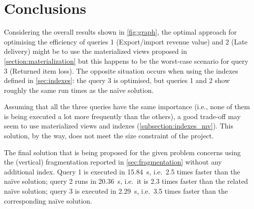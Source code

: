 

\section{Conclusions}
\label{section:conclusions}

Considering the overall results shown in \autoref{fig:graph}, the optimal approach for optimising the efficiency of queries 1 (Export/import revenue value) and 2 (Late delivery) might be to use the materialized views proposed in \autoref{section:materialization} but this happens to be the worst-case scenario for query 3 (Returned item loss).
The opposite situation occurs when using the indexes defined in \autoref{sec:indexes}: the query 3 is optimised, but queries 1 and 2 show roughly the same run times as the na\"{i}ve solution.

Assuming that all the three queries have the same importance (i.e., none of them is being executed a lot more frequently than the others), a good trade-off may seem to use materialized views and indexes (\autoref{subsection:indexes_mv}). This solution, by the way, does not meet the size constraint of the project.

The final solution that is being proposed for the given problem concerns using the (vertical) fragmentation reported in \autoref{sec:fragmentation} without any additional index. Query 1 is executed in \SI{15.84}{\s}, i.e.\ 2.5 times faster than the na\"{i}ve solution; query 2 runs in \SI{20.36}{\s}, i.e.\ it is 2.3 times faster than the related na\"{i}ve solution; query 3 is executed in \SI{2.29}{\s}, i.e.\ 3.5 times faster than the corresponding na\"{i}ve solution.


